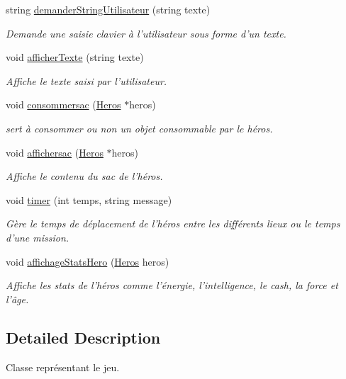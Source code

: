 \begin{DoxyCompactItemize}
string \hyperlink{class_jeu_a4b70e906117c6a21b989ad3ab672c83c}{demander\-String\-Utilisateur} (string texte)
\begin{DoxyCompactList}\small\item\em Demande une saisie clavier à l'utilisateur sous forme d'un texte. \end{DoxyCompactList}\item 
void \hyperlink{class_jeu_aa09fb40439f16b9665a0d76679f78e4e}{afficher\-Texte} (string texte)
\begin{DoxyCompactList}\small\item\em Affiche le texte saisi par l'utilisateur. \end{DoxyCompactList}\item 
void \hyperlink{class_jeu_a26c7a428a96b1f987150cb708fa7d903}{consommersac} (\hyperlink{class_heros}{Heros} $\ast$heros)
\begin{DoxyCompactList}\small\item\em sert à consommer ou non un objet consommable par le héros. \end{DoxyCompactList}\item 
void \hyperlink{class_jeu_ac70f7bfb1945030e04287da3a35973af}{affichersac} (\hyperlink{class_heros}{Heros} $\ast$heros)
\begin{DoxyCompactList}\small\item\em Affiche le contenu du sac de l'héros. \end{DoxyCompactList}\item 
void \hyperlink{class_jeu_a52ce4fb6c415b45209db13a589c9d675}{timer} (int temps, string message)
\begin{DoxyCompactList}\small\item\em Gère le temps de déplacement de l'héros entre les différents lieux ou le temps d'une mission. \end{DoxyCompactList}\item 
void \hyperlink{class_jeu_a7f9e3b8e6f3ad5d2c47ae29c54f2bdc4}{affichage\-Stats\-Hero} (\hyperlink{class_heros}{Heros} heros)
\begin{DoxyCompactList}\small\item\em Affiche les stats de l'héros comme l'énergie, l'intelligence, le cash, la force et l'âge. \end{DoxyCompactList}\end{DoxyCompactItemize}


\subsection{Detailed Description}
Classe représentant le jeu. 

